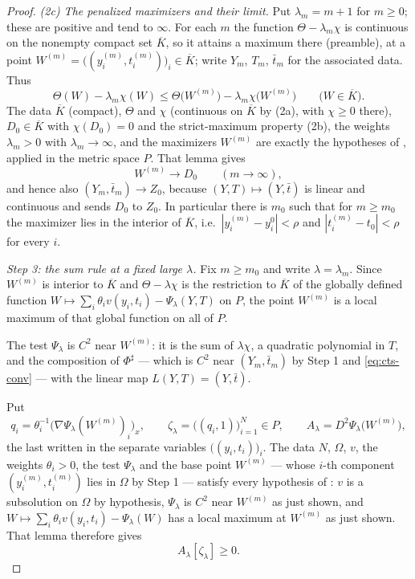 \begin{proof}
\emph{(2c) The penalized maximizers and their limit.}
Put $\lambda_m=m+1$ for $m\ge0$; these are positive and tend to $\infty$. For
each $m$ the function $\Theta-\lambda_m\chi$ is continuous on the nonempty
compact set $\overline K$, so it attains a maximum there (preamble), at a point
$W^{(m)}=\bigl((y_i^{(m)},t_i^{(m)})\bigr)_i\in\overline K$; write $Y_m$, $T_m$,
$\bar t_m$ for the associated data. Thus
\[
  \Theta(W)-\lambda_m\chi(W)\le\Theta\bigl(W^{(m)}\bigr)
    -\lambda_m\chi\bigl(W^{(m)}\bigr)\qquad\bigl(W\in\overline K\bigr).
\]
The data $\overline K$ (compact), $\Theta$ and $\chi$ (continuous on
$\overline K$ by (2a), with $\chi\ge0$ there), $D_0\in\overline K$ with
$\chi(D_0)=0$ and the strict-maximum property (2b), the weights $\lambda_m>0$
with $\lambda_m\to\infty$, and the maximizers $W^{(m)}$ are exactly the
hypotheses of , applied in the metric space
$P$. That lemma gives
\begin{equation}\label{eq:cts-conv}
  W^{(m)}\longrightarrow D_0\qquad(m\to\infty),
\end{equation}
and hence also $(Y_m,\bar t_m)\to Z_0$, because $(Y,T)\mapsto(Y,\bar t)$ is
linear and continuous and sends $D_0$ to $Z_0$. In particular there is $m_0$
such that for $m\ge m_0$ the maximizer lies in the interior of $\overline K$,
i.e.\ $|y_i^{(m)}-y_i^0|<\rho$ and $|t_i^{(m)}-t_0|<\rho$ for every $i$.

\emph{Step 3: the sum rule at a fixed large $\lambda$.}
Fix $m\ge m_0$ and write $\lambda=\lambda_m$. Since $W^{(m)}$ is interior to
$\overline K$ and $\Theta-\lambda\chi$ is the restriction to $\overline K$ of
the globally defined function
$W\mapsto\sum_i\theta_iv(y_i,t_i)-\Psi_\lambda(Y,T)$ on $P$, the point
$W^{(m)}$ is a local maximum of that global function on all of $P$.

The test $\Psi_\lambda$ is $C^2$ near $W^{(m)}$: it is the sum of
$\lambda\chi$, a quadratic polynomial in $T$, and the composition of
$\Phi^\sharp$ --- which is $C^2$ near $(Y_m,\bar t_m)$ by Step 1 and
\eqref{eq:cts-conv} --- with the linear map $L(Y,T)=(Y,\bar t)$.

Put
\[
  q_i=\theta_i^{-1}\bigl(\nabla\Psi_\lambda(W^{(m)})_i\bigr)_x,\qquad
  \zeta_\lambda=\bigl((q_i,1)\bigr)_{i=1}^N\in P,\qquad
  A_\lambda=D^2\Psi_\lambda\bigl(W^{(m)}\bigr),
\]
the last written in the separate variables $\bigl((y_i,t_i)\bigr)_i$. The data
$N$, $\Omega$, $v$, the weights $\theta_i>0$, the test $\Psi_\lambda$ and the
base point $W^{(m)}$ --- whose $i$-th component $(y_i^{(m)},t_i^{(m)})$ lies in
$\Omega$ by Step 1 --- satisfy every hypothesis of
: $v$ is a subsolution on $\Omega$ by
hypothesis, $\Psi_\lambda$ is $C^2$ near $W^{(m)}$ as just shown, and
$W\mapsto\sum_i\theta_iv(y_i,t_i)-\Psi_\lambda(W)$ has a local maximum at
$W^{(m)}$ as just shown. That lemma therefore gives
\begin{equation}\label{eq:cts-Alambda}
  A_\lambda[\zeta_\lambda]\ge0 .
\end{equation}


\end{proof}

